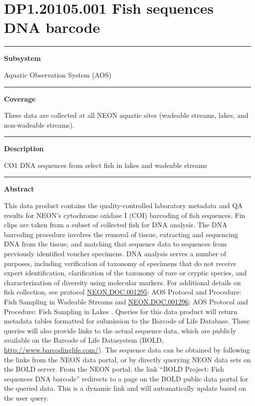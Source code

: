 \documentclass[]{article}
\begin{document}
\section{DP1.20105.001 Fish sequences DNA
barcode}\label{dp1.20105.001-fish-sequences-dna-barcode}

\begin{center}\rule{0.5\linewidth}{\linethickness}\end{center}

\textbf{Subsystem}

Aquatic Observation System (AOS)

\begin{center}\rule{0.5\linewidth}{\linethickness}\end{center}

\textbf{Coverage}

These data are collected at all NEON aquatic sites (wadeable streams,
lakes, and non-wadeable streams).

\begin{center}\rule{0.5\linewidth}{\linethickness}\end{center}

\textbf{Description}

CO1 DNA sequences from select fish in lakes and wadeable streams

\begin{center}\rule{0.5\linewidth}{\linethickness}\end{center}

\textbf{Abstract}

This data product contains the quality-controlled laboratory metadata
and QA results for NEON's cytochrome oxidase I (COI) barcoding of fish
sequences. Fin clips are taken from a subset of collected fish for DNA
analysis. The DNA barcoding procedure involves the removal of tissue,
extracting and sequencing DNA from the tissue, and matching that
sequence data to sequences from previously identified voucher specimens.
DNA analysis serves a number of purposes, including verification of
taxonomy of specimens that do not receive expert identification,
clarification of the taxonomy of rare or cryptic species, and
characterization of diversity using molecular markers. For additional
details on fish collection, see protocol
\href{http://data.neonscience.org/api/v0/documents/NEON.DOC.001295vD}{NEON.DOC.001295}:
AOS Protocol and Procedure: Fish Sampling in Wadeable Streams and
\href{http://data.neonscience.org/api/v0/documents/NEON.DOC.NEON.DOC.001296vD}{NEON.DOC.001296}:
AOS Protocol and Procedure: Fish Sampling in Lakes . Queries for this
data product will return metadata tables formatted for submission to the
Barcode of Life Database. These queries will also provide links to the
actual sequence data, which are publicly available on the Barcode of
Life Datasystem (BOLD, \url{http://www.barcodinglife.com/}). The
sequence data can be obtained by following the links from the NEON data
portal, or by directly querying NEON data sets on the BOLD server. From
the NEON portal, the link ``BOLD Project: Fish sequences DNA barcode''
redirects to a page on the BOLD public data portal for the queried data.
This is a dynamic link and will automatically update based on the user
query.
\end{document}
